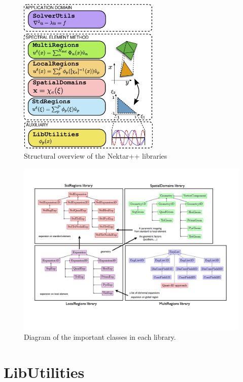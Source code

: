 \begin{figure}
\centering
\includegraphics[width=0.6\textwidth]{img/architecture}
\caption{Structural overview of the Nektar++ libraries}
\label{f:library:structure}
\end{figure}

\begin{figure}
\centering
\includegraphics[width=\textwidth]{img/overview.png}
\caption{Diagram of the important classes in each library.}
\label{f:library:overview}
\end{figure}

\section{LibUtilities}

